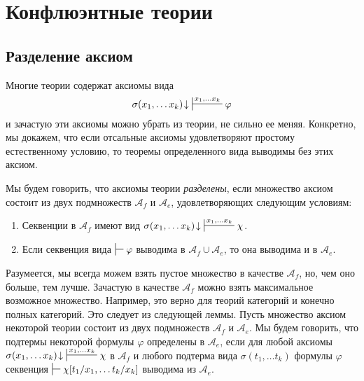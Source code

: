 \documentclass[reqno]{amsart}
\theoremstyle{definition}
\theoremstyle{remark}
\begin{document}
\section{Конфлюэнтные теории}

\subsection{Разделение аксиом}

Многие теории содержат аксиомы вида
\[ \sigma(x_1, \ldots x_k)\!\downarrow\ \sststile{}{x_1, \ldots x_k} \varphi \]
и зачастую эти аксиомы можно убрать из теории, не сильно ее меняя.
Конкретно, мы докажем, что если отсальные аксиомы удовлетворяют простому естественному условию, то теоремы определенного вида выводимы без этих аксиом.

Мы будем говорить, что аксиомы теории \emph{разделены}, если множество аксиом состоит из двух подмножеств $\mathcal{A}_f$ и $\mathcal{A}_e$, удовлетворяющих следующим условиям:
\begin{enumerate}
\item \label{it:sep-f} Секвенции в $\mathcal{A}_f$ имеют вид $\sigma(x_1, \ldots x_k)\!\downarrow\ \sststile{}{x_1, \ldots x_k} \chi$.
\item \label{it:sep-e} Если секвенция вида $\sststile{}{} \varphi$ выводима в $\mathcal{A}_f \cup \mathcal{A}_e$, то она выводима и в $\mathcal{A}_e$.
\end{enumerate}

Разумеется, мы всегда можем взять пустое множество в качестве $\mathcal{A}_f$, но, чем оно больше, тем лучше.
Зачастую в качестве $\mathcal{A}_f$ можно взять максимальное возможное множество.
Например, это верно для теорий категорий и конечно полных категорий.
Это следует из следующей леммы.
Пусть множество аксиом некоторой теории состоит из двух подмножеств $\mathcal{A}_f$ и $\mathcal{A}_e$.
Мы будем говорить, что подтермы некоторой формулы $\varphi$ определены в $\mathcal{A}_e$, если для любой аксиомы $\sigma(x_1, \ldots x_k)\!\downarrow\ \sststile{}{x_1, \ldots x_k} \chi$ в $\mathcal{A}_f$
и любого подтерма вида $\sigma(t_1, \ldots t_k)$ формулы $\varphi$ секвенция $\sststile{}{} \chi[t_1/x_1, \ldots t_k/x_k]$ выводима из $\mathcal{A}_e$.
\end{document}
